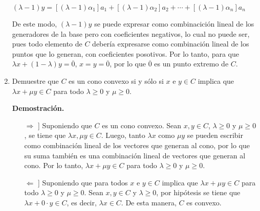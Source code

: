 \documentclass[fleqn, 12pt]{article}
\begin{document}
\begin{enumerate}
		$ \left( \lambda - 1 \right) y = \left[\left( \lambda - 1 \right) \alpha_1\right] a_1 + \left[\left( \lambda - 1 \right) \alpha_2\right] a_2 + \cdots +\left[  \left( \lambda - 1 \right)\alpha_n \right] a_n $

		De este modo, $ \left( \lambda - 1 \right) y $ se puede expresar como combinacición lineal de los generadores de la base pero con coeficientes negativos, lo cual no puede ser, pues todo elemento de $ C $ debería expresarse como combinación lineal de los puntos que lo generan, con coeficientes posotivos. Por lo tanto, para que $ \lambda x + \left( 1 - \lambda \right) y = \overline{0} $, $ x = y = \overline{0} $, por lo que $ \overline{0} $ es un punto extremo de $ C $.

		\item Demuestre que $ C $ es un cono convexo si y sólo si $ x $ e $ y \in C $ implica que $ \lambda x + \mu y \in C $ para todo $ \lambda \geq 0 $ y $ \mu \geq 0 $.
		
		\textbf{Demostración.}

		\begin{itemize}
			\item[$ \Longrightarrow $ \hspace{-4mm} ]] Suponiendo que $ C $ es un cono convexo. Sean $ x, y \in C $, $ \lambda \geq 0 $ y $ \mu \geq 0 $, se tiene que $ \lambda x, \mu y \in C $. Luego, tanto $ \lambda x $ como $ \mu y $ se pueden escribir como combinación lineal de los vectores que generan al cono, por lo que su suma también es una combinación lineal de vectores que generan al cono. Por lo tanto, $ \lambda x + \mu y \in C $ para todo $ \lambda \geq 0 $ y $ \mu \geq 0 $.
			\item[$ \Longleftarrow $ \hspace{-4mm} ]] Suponiendo que para todos $ x $ e $ y \in C $ implica que $ \lambda x + \mu y \in C $ para todo $ \lambda \geq 0 $ y $ \mu \geq 0 $. Sean $ x,y \in C $ y $ \lambda \geq 0 $, por hipótesis se tiene que $ \lambda x + 0 \cdot y \in C $, es decir, $ \lambda x \in C $. De esta manera, $ C $ es convexo.
		\end{itemize}
	\end{enumerate}
\end{document}
